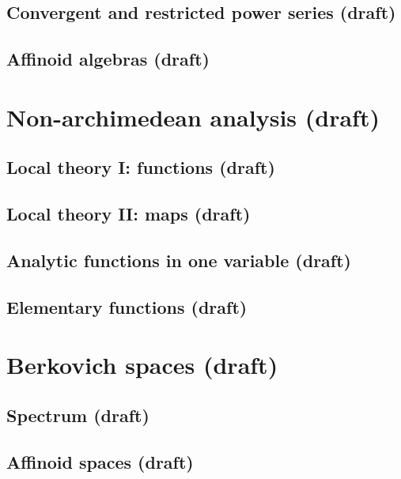 \documentclass[sectionlevel=book]{noteformyself}
\begin{document}
        \section{Convergent and restricted power series (draft)}
        
        \section{Affinoid algebras (draft)}
        

    \chapter{Non-archimedean analysis (draft)}
        \section{Local theory I: functions (draft)}
        
        \section{Local theory II: maps (draft)}
        
        \section{Analytic functions in one variable (draft)}
        
        \section{Elementary functions (draft)}
        

    \chapter{Berkovich spaces (draft)}
        \section{Spectrum (draft)}
        
        \section{Affinoid spaces (draft)}
        
\end{document}
